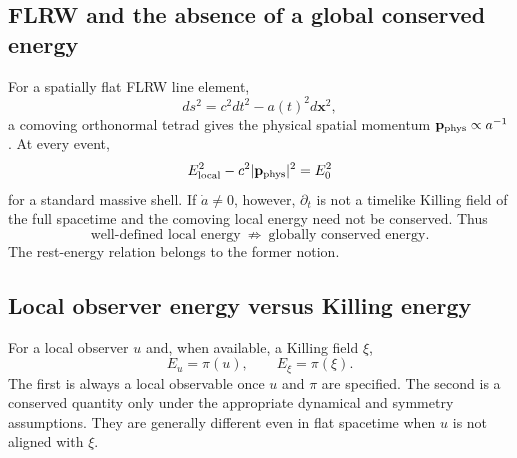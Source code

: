 \documentclass[11pt,a4paper]{article}
\begin{document}
\subsection{FLRW and the absence of a global conserved energy}
For a spatially flat FLRW line element,
\begin{equation}
 ds^2=c^2dt^2-a(t)^2d\mathbf x^2,
\end{equation}
a comoving orthonormal tetrad gives the physical spatial momentum $\mathbf p_{\rm phys}\propto a^{-1}$.  At every event,
\begin{equation}
 E_{\rm local}^2-c^2|\mathbf p_{\rm phys}|^2=E_0^2
\end{equation}
for a standard massive shell.  If $\dot a\ne0$, however, $\partial_t$ is not a timelike Killing field of the full spacetime and the comoving local energy need not be conserved.  Thus
\begin{equation}
 \boxed{\text{well-defined local energy}\ \not\Rightarrow\ \text{globally conserved energy}.}
\end{equation}
The rest-energy relation belongs to the former notion.

\subsection{Local observer energy versus Killing energy}
For a local observer $u$ and, when available, a Killing field $\xi$,
\begin{equation}
 E_u=\pi(u),\qquad E_\xi=\pi(\xi).
\end{equation}
The first is always a local observable once $u$ and $\pi$ are specified.  The second is a conserved quantity only under the appropriate dynamical and symmetry assumptions.  They are generally different even in flat spacetime when $u$ is not aligned with $\xi$.
\end{document}
